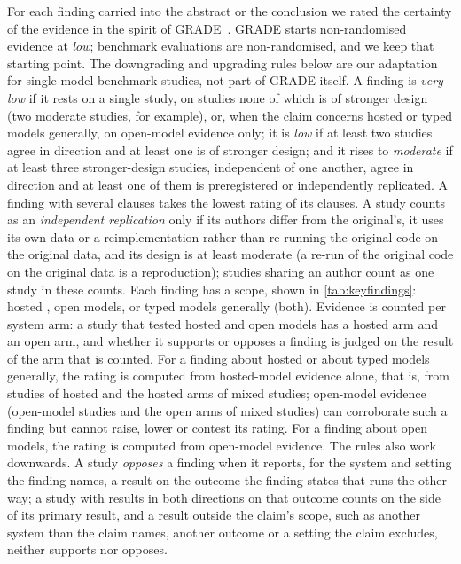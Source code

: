 For each finding carried into the abstract or the conclusion we rated the certainty of the evidence in the spirit of GRADE~\cite{guyatt2008grade}.
GRADE starts non-randomised evidence at \emph{low}; benchmark evaluations are non-randomised, and we keep that starting point. The downgrading and upgrading rules below are our adaptation for single-model benchmark studies, not part of GRADE itself.
A finding is \emph{very low} if it rests on a single study, on studies none of which is of stronger design (two moderate studies, for example), or, when the claim concerns hosted \jev{} or typed models generally, on open-model evidence only; it is \emph{low} if at least two studies agree in direction and at least one is of stronger design; and it rises to \emph{moderate} if at least three stronger-design studies, independent of one another, agree in direction and at least one of them is preregistered or independently replicated. A finding with several clauses takes the lowest rating of its clauses.
A study counts as an \emph{independent replication} only if its authors differ from the original's, it uses its own data or a reimplementation rather than re-running the original code on the original data, and its design is at least moderate (a re-run of the original code on the original data is a reproduction); studies sharing an author count as one study in these counts.
Each finding has a scope, shown in \cref{tab:keyfindings}: hosted \jev{}, open models, or typed models generally (both). Evidence is counted per system arm: a study that tested hosted \jev{} and open models has a hosted arm and an open arm, and whether it supports or opposes a finding is judged on the result of the arm that is counted. For a finding about hosted \jev{} or about typed models generally, the rating is computed from hosted-model evidence alone, that is, from studies of hosted \jev{} and the hosted arms of mixed studies; open-model evidence (open-model studies and the open arms of mixed studies) can corroborate such a finding but cannot raise, lower or contest its rating. For a finding about open models, the rating is computed from open-model evidence.
The rules also work downwards. A study \emph{opposes} a finding when it reports, for the system and setting the finding names, a result on the outcome the finding states that runs the other way; a study with results in both directions on that outcome counts on the side of its primary result, and a result outside the claim's scope, such as another system than the claim names, another outcome or a setting the claim excludes, neither supports nor opposes.
